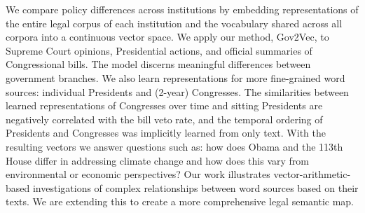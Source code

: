 We compare policy differences across institutions by embedding representations of the entire legal corpus of each institution and the vocabulary shared across all corpora into a continuous vector space. We apply our method, Gov2Vec, to Supreme Court opinions, Presidential actions, and official summaries of Congressional bills. The model discerns meaningful differences between government branches. We also learn representations for more fine-grained word sources: individual Presidents and (2-year) Congresses. The similarities between learned representations of Congresses over time and sitting Presidents are negatively correlated with the bill veto rate, and the temporal ordering of Presidents and Congresses was implicitly learned from only text. With the resulting vectors we answer questions such as: how does Obama and the 113th House differ in addressing climate change and how does this vary from environmental or economic perspectives? Our work illustrates vector-arithmetic-based investigations of complex relationships between word sources based on their texts. We are extending this to create a more comprehensive legal semantic map.
